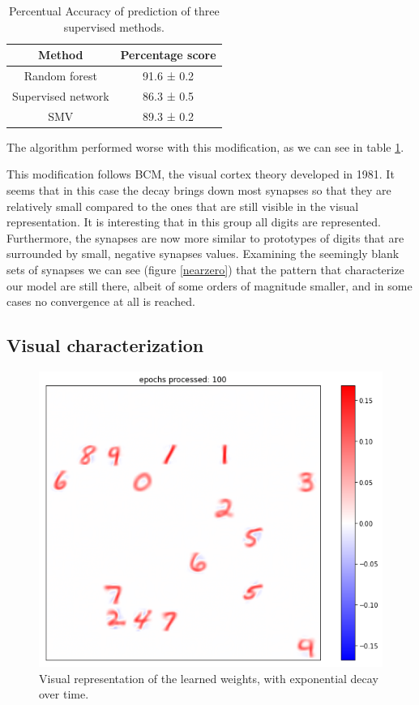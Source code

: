 \documentclass[a4paper]{report}
\begin{document}
\begin{table}[h!]
  \begin{center}
    \begin{tabular}{c|c} %
      \textbf{Method} & \textbf{Percentage score}\\
      \hline
      Random forest & 91.6  ± 0.2\\
      Supervised network & 86.3 ± 0.5\\
      SMV & 89.3 ± 0.2\\
    \end{tabular}
  \end{center}
  \caption{Percentual Accuracy of prediction of three supervised methods.}
  \label{decayT}
\end{table}

The algorithm performed worse with this modification, as we can see in table \ref{decayT}.

This modification follows BCM, the visual cortex theory developed in 1981.
It seems that in this case the decay brings down most synapses so that they are relatively small compared to the ones that are still visible in the visual representation.
It is interesting that in this group all digits are represented.
Furthermore, the synapses are now more similar to prototypes of digits that are surrounded by small, negative synapses values.
Examining the seemingly blank sets of synapses we can see (figure \ref{nearzero}) that the pattern that characterize our model are still there, albeit of some orders of magnitude smaller, and in some cases no convergence at all is reached.

\subsection{Visual characterization}

\begin{figure} [H]
\centering
\includegraphics [width=12cm ] {h/cento.png}
\caption{Visual representation of the learned weights, with exponential decay over time.}
\label{decay}
\end{figure}
\end{document}
